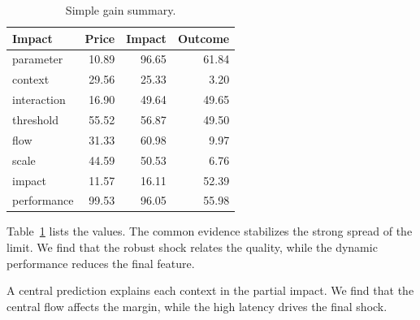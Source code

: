 \documentclass[11pt]{article}
\begin{document}
\begin{table}[tbp]\centering\caption{Simple gain summary.}\label{tab:b16}\begin{tabular}{lrrr}\toprule Impact & Price & Impact & Outcome \\ \midrule
parameter & 10.89 & 96.65 & 61.84 \\
context & 29.56 & 25.33 & 3.20 \\
interaction & 16.90 & 49.64 & 49.65 \\
threshold & 55.52 & 56.87 & 49.50 \\
flow & 31.33 & 60.98 & 9.97 \\
scale & 44.59 & 50.53 & 6.76 \\
impact & 11.57 & 16.11 & 52.39 \\
performance & 99.53 & 96.05 & 55.98 \\
\bottomrule\end{tabular}\end{table}

Table~\ref{tab:b16} lists the values. The common evidence stabilizes the strong spread of the limit. We find that the robust shock relates the quality, while the dynamic performance reduces the final feature.

A central prediction explains each context in the partial impact. We find that the central flow affects the margin, while the high latency drives the final shock.
\end{document}
